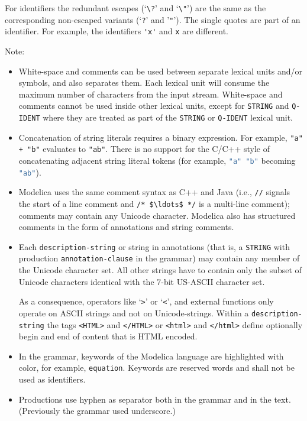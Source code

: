For identifiers the redundant escapes (`\lstinline!\?!' and `\lstinline!\"!') are the same as the corresponding non-escaped variants (`\lstinline!?!' and '\lstinline!"!').
The single quotes are part of an identifier.
For example, the identifiers \lstinline!'x'! and \lstinline!x! are different.

Note:
\begin{itemize}
\item
  White-space and comments can be used between separate lexical units and/or symbols, and also separates them. Each lexical unit will consume the maximum number of characters from the input stream.
  White-space and comments cannot be used inside other lexical units, except for \lstinline[language=grammar]!STRING! and \lstinline[language=grammar]!Q-IDENT! where they are treated as part of the \lstinline[language=grammar]!STRING! or \lstinline[language=grammar]!Q-IDENT! lexical unit.
\item
  Concatenation of string literals requires a binary expression.
  For example, \lstinline!"a" + "b"! evaluates to \lstinline!"ab"!.
  There is no support for the C/C++ style of concatenating adjacent string literal tokens (for example, \lstinline[language=C]!"a" "b"! becoming \lstinline[language=C]!"ab"!).
\item
  Modelica uses the same comment syntax as C++ and Java (i.e., \lstinline!//! signals the start of a line comment and \lstinline!/* $\ldots$ */! is a multi-line comment); comments may contain any Unicode character.
  Modelica also has structured comments in the form of annotations and string comments.
\item
  Each \lstinline[language=grammar]!description-string! or string in annotations (that is, a \lstinline[language=grammar]!STRING! with production \lstinline[language=grammar]!annotation-clause! in the grammar) may contain any member of the Unicode character set.
  All other strings have to contain only the subset of Unicode characters identical with the 7-bit US-ASCII character set.
  \begin{nonnormative}
  As a consequence, operators like `\lstinline!>!' or `\lstinline!<!', and external functions only operate on ASCII strings and not on Unicode-strings.
  Within a \lstinline[language=grammar]!description-string! the tags \lstinline!<HTML>! and \lstinline!</HTML>! or \lstinline!<html>! and \lstinline!</html>! define optionally begin and end of content that is HTML encoded.
  \end{nonnormative}
\item
  In the grammar, keywords of the Modelica language are highlighted with color, for example, \lstinline[language=grammar]!equation!.
  Keywords are reserved words and shall not be used as identifiers.
\item
  Productions use hyphen as separator both in the grammar and in the text.
  (Previously the grammar used underscore.)
\end{itemize}


